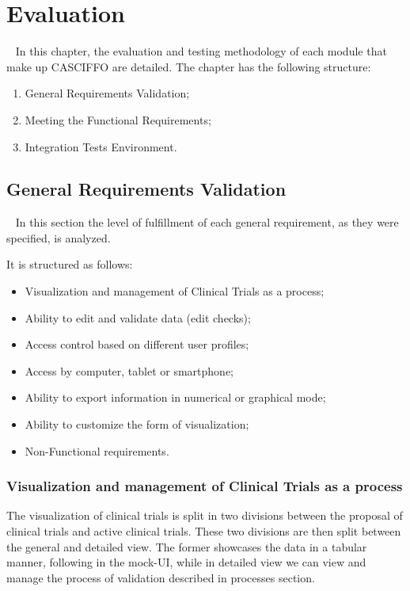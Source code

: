 % 
%
\chapter{Evaluation}~\label{ch:eval}
In this chapter, the evaluation and testing methodology of each module that make up CASCIFFO are detailed.
The chapter has the following structure:
\begin{enumerate}
    \item General Requirements Validation;
    \item Meeting the Functional Requirements;
    \item Integration Tests Environment.
\end{enumerate}

\section{General Requirements Validation}~\label{ch:eval:sec:reqs}
In this section the level of fulfillment of each general requirement, as they were specified, is analyzed.

It is structured as follows:
\begin{itemize}
    \item Visualization and management of Clinical Trials as a process;
    \item Ability to edit and validate data (edit checks);
    \item Access control based on different user profiles;
    \item Access by computer, tablet or smartphone;
    \item Ability to export information in numerical or graphical mode;
    \item Ability to customize the form of visualization;
    \item Non-Functional requirements.
\end{itemize}


\subsection{Visualization and management of Clinical Trials as a process}
The visualization of clinical trials is split in two divisions between the proposal of clinical trials and active clinical trials. These two divisions are then split between the general and detailed view. The former showcases the data in a tabular manner, following in the mock-UI, while in detailed view we can view and manage the process of validation described in processes section.


